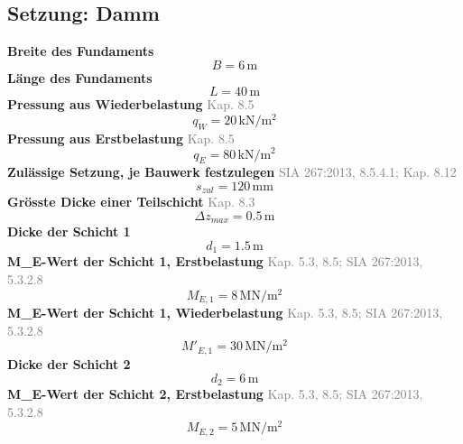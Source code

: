 \documentclass[11pt,a4paper]{article}
\newcommand{\normref}[1]{{\small\textcolor{gray}{#1}}}
\begin{document}
\subsection{Setzung: Damm}
\noindent\textbf{Breite des Fundaments}
\begin{equation*}
B = 6\,\mathrm{m}
\end{equation*}
\noindent\textbf{Länge des Fundaments}
\begin{equation*}
L = 40\,\mathrm{m}
\end{equation*}
\noindent\textbf{Pressung aus Wiederbelastung} \hfill \normref{Kap. 8.5}
\begin{equation*}
q_W = 20\,\mathrm{kN}/\mathrm{m}^{2}
\end{equation*}
\noindent\textbf{Pressung aus Erstbelastung} \hfill \normref{Kap. 8.5}
\begin{equation*}
q_E = 80\,\mathrm{kN}/\mathrm{m}^{2}
\end{equation*}
\noindent\textbf{Zulässige Setzung, je Bauwerk festzulegen} \hfill \normref{SIA 267:2013, 8.5.4.1; Kap. 8.12}
\begin{equation*}
s_{zul} = 120\,\mathrm{mm}
\end{equation*}
\noindent\textbf{Grösste Dicke einer Teilschicht} \hfill \normref{Kap. 8.3}
\begin{equation*}
\Delta z_{max} = 0.5\,\mathrm{m}
\end{equation*}
\noindent\textbf{Dicke der Schicht 1}
\begin{equation*}
d_{1} = 1.5\,\mathrm{m}
\end{equation*}
\noindent\textbf{M\_E-Wert der Schicht 1, Erstbelastung} \hfill \normref{Kap. 5.3, 8.5; SIA 267:2013, 5.3.2.8}
\begin{equation*}
M_{E,1} = 8\,\mathrm{MN}/\mathrm{m}^{2}
\end{equation*}
\noindent\textbf{M\_E-Wert der Schicht 1, Wiederbelastung} \hfill \normref{Kap. 5.3, 8.5; SIA 267:2013, 5.3.2.8}
\begin{equation*}
M'_{E,1} = 30\,\mathrm{MN}/\mathrm{m}^{2}
\end{equation*}
\noindent\textbf{Dicke der Schicht 2}
\begin{equation*}
d_{2} = 6\,\mathrm{m}
\end{equation*}
\noindent\textbf{M\_E-Wert der Schicht 2, Erstbelastung} \hfill \normref{Kap. 5.3, 8.5; SIA 267:2013, 5.3.2.8}
\begin{equation*}
M_{E,2} = 5\,\mathrm{MN}/\mathrm{m}^{2}
\end{equation*}
\end{document}
